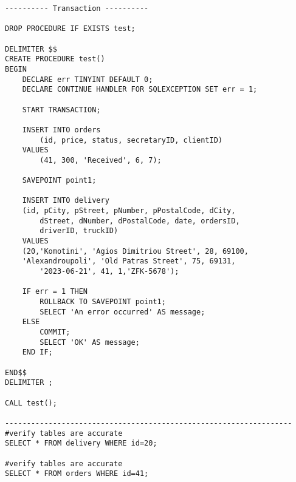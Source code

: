 \begin{lstlisting}
---------- Transaction ----------

DROP PROCEDURE IF EXISTS test;

DELIMITER $$
CREATE PROCEDURE test() 
BEGIN
	DECLARE err TINYINT DEFAULT 0; 
	DECLARE CONTINUE HANDLER FOR SQLEXCEPTION SET err = 1;
    
	START TRANSACTION;
    
	INSERT INTO orders
		(id, price, status, secretaryID, clientID)
	VALUES
		(41, 300, 'Received', 6, 7);

	SAVEPOINT point1; 

	INSERT INTO delivery
	(id, pCity, pStreet, pNumber, pPostalCode, dCity, 
        dStreet, dNumber, dPostalCode, date, ordersID, 
        driverID, truckID)
	VALUES
	(20,'Komotini', 'Agios Dimitriou Street', 28, 69100, 
	'Alexandroupoli', 'Old Patras Street', 75, 69131, 
        '2023-06-21', 41, 1,'ZFK-5678');
    
	IF err = 1 THEN
		ROLLBACK TO SAVEPOINT point1;
		SELECT 'An error occurred' AS message;
	ELSE
		COMMIT;
		SELECT 'OK' AS message;
	END IF; 
    
END$$
DELIMITER ;

CALL test(); 

------------------------------------------------------------------
#verify tables are accurate
SELECT * FROM delivery WHERE id=20;

#verify tables are accurate
SELECT * FROM orders WHERE id=41;
\end{lstlisting}
